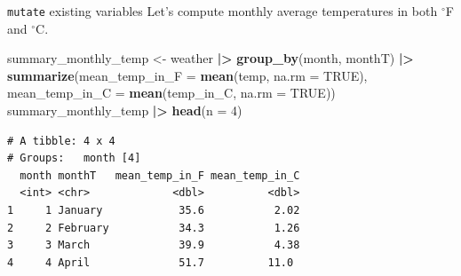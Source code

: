 \documentclass[
  ignorenonframetext,
]{beamer}
\newenvironment{Shaded}{\begin{snugshade}}{\end{snugshade}}
\newcommand{\AttributeTok}[1]{\textcolor[rgb]{0.13,0.29,0.53}{#1}}
\newcommand{\ConstantTok}[1]{\textcolor[rgb]{0.56,0.35,0.01}{#1}}
\newcommand{\DecValTok}[1]{\textcolor[rgb]{0.00,0.00,0.81}{#1}}
\newcommand{\FunctionTok}[1]{\textcolor[rgb]{0.13,0.29,0.53}{\textbf{#1}}}
\newcommand{\NormalTok}[1]{#1}
\newcommand{\OtherTok}[1]{\textcolor[rgb]{0.56,0.35,0.01}{#1}}
\newcommand{\SpecialCharTok}[1]{\textcolor[rgb]{0.81,0.36,0.00}{\textbf{#1}}}
\begin{document}
\begin{frame}[fragile]{\texttt{mutate} existing variables}
\protect\hypertarget{mutate-existing-variables-3}{}
Let's compute monthly average temperatures in both \(^\circ\)F and
\(^\circ\)C.

\normalsize

\begin{Shaded}
\begin{Highlighting}[]
\NormalTok{summary\_monthly\_temp }\OtherTok{\textless{}{-}}\NormalTok{ weather }\SpecialCharTok{|\textgreater{}} 
  \FunctionTok{group\_by}\NormalTok{(month, monthT) }\SpecialCharTok{|\textgreater{}} 
  \FunctionTok{summarize}\NormalTok{(}\AttributeTok{mean\_temp\_in\_F =} \FunctionTok{mean}\NormalTok{(temp, }\AttributeTok{na.rm =} \ConstantTok{TRUE}\NormalTok{), }
            \AttributeTok{mean\_temp\_in\_C =} \FunctionTok{mean}\NormalTok{(temp\_in\_C, }\AttributeTok{na.rm =} \ConstantTok{TRUE}\NormalTok{)) }
\NormalTok{summary\_monthly\_temp }\SpecialCharTok{|\textgreater{}}
  \FunctionTok{head}\NormalTok{(}\AttributeTok{n =} \DecValTok{4}\NormalTok{)}
\end{Highlighting}
\end{Shaded}

\begin{verbatim}
# A tibble: 4 x 4
# Groups:   month [4]
  month monthT   mean_temp_in_F mean_temp_in_C
  <int> <chr>             <dbl>          <dbl>
1     1 January            35.6           2.02
2     2 February           34.3           1.26
3     3 March              39.9           4.38
4     4 April              51.7          11.0 
\end{verbatim}

\normalsize
\end{frame}
\end{document}
